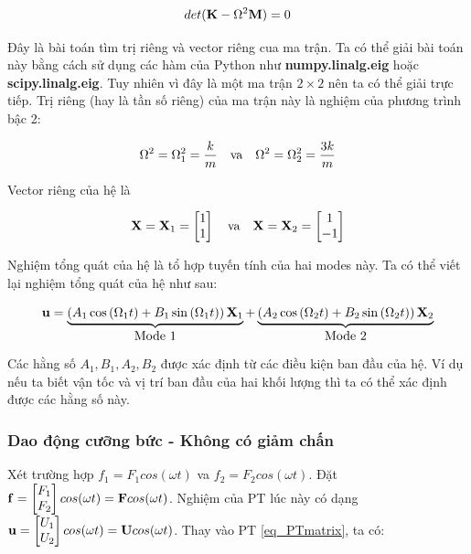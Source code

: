 \begin{equation}
    det({\bf K}-\Omega^2{\bf M}) = 0
\end{equation}

Đây là bài toán tìm trị riêng và vector riêng cua ma trận. Ta có thể giải bài toán này bằng cách sử dụng các hàm của Python như \textbf{numpy.linalg.eig} hoặc \textbf{scipy.linalg.eig}. Tuy nhiên vì đây là một ma trận $2\times 2$ nên ta có thể giải trực tiếp. Trị riêng (hay là tần số riêng) của ma trận này là nghiệm của phương trình bậc 2:

\begin{equation}
    \Omega^2 =  \Omega_1^2 = \frac{k}{m} \quad \hbox{va} \quad \Omega^2 = \Omega_2^2 = \frac{3k}{m}
\end{equation}

Vector riêng của hệ là

\begin{equation}
    {\bf X} = {\bf X}_1 = \begin{bmatrix}
        1 \\ 1
    \end{bmatrix} \quad \hbox{va} \quad {\bf X} = {\bf X}_2 = \begin{bmatrix}
        1 \\ -1
    \end{bmatrix}
\end{equation}

Nghiệm tổng quát của hệ là tổ hợp tuyến tính của hai modes này. Ta có thể viết lại nghiệm tổng quát của hệ như sau:

\begin{equation}
    {\bf u}=\underbrace{\left(A_1 \cos \left(\Omega_1 t\right)+B_1 \sin \left(\Omega_1 t\right)\right) {\bf X}_1}_{\hbox{Mode 1}}+\underbrace{\left(A_2 \cos \left(\Omega_2 t\right)+B_2 \sin \left(\Omega_2 t\right)\right) {\bf X}_2}_{\hbox{Mode 2}}
\end{equation}

Các hằng số $A_1, B_1, A_2, B_2$ được xác định từ các điều kiện ban đầu của hệ. Ví dụ nếu ta biết vận tốc và vị trí ban đầu của hai khối lượng thì ta có thể xác định được các hằng số này.

\subsubsection{Dao động cưỡng bức - Không có giảm chấn}

Xét trường hợp $f_1 = F_1cos(\omega t)$ va $f_2 = F_2cos(\omega t)$. Đặt ${\bf f} = \begin{bmatrix} F_1 \\ F_2\end{bmatrix}cos(\omega t) = {\bf F}cos(\omega t)$. Nghiệm của PT lúc này có dạng ${\bf u} = \begin{bmatrix} U_1 \\ U_2\end{bmatrix}cos(\omega t) = {\bf U}cos(\omega t)$. Thay vào PT \cref{eq_PTmatrix}, ta có:

